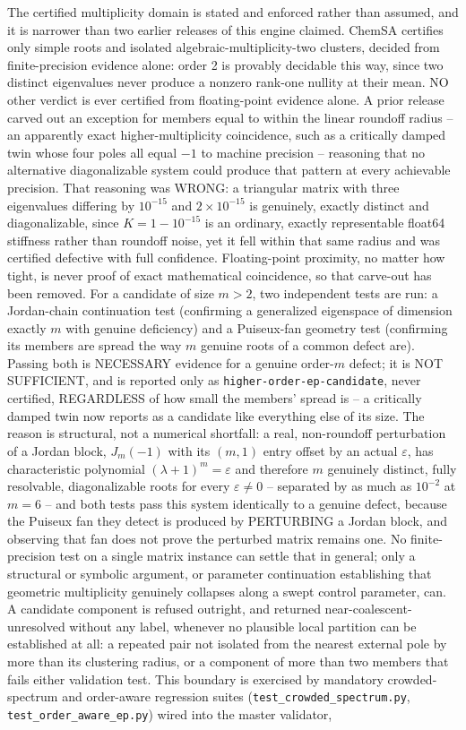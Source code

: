 The certified multiplicity domain is stated and enforced rather than assumed, and it is narrower than two earlier releases of this engine claimed. ChemSA certifies only simple roots and isolated algebraic-multiplicity-two clusters, decided from finite-precision evidence alone: order 2 is provably decidable this way, since two distinct eigenvalues never produce a nonzero rank-one nullity at their mean. NO other verdict is ever certified from floating-point evidence alone. A prior release carved out an exception for members equal to within the linear roundoff radius -- an apparently exact higher-multiplicity coincidence, such as a critically damped twin whose four poles all equal \(-1\) to machine precision -- reasoning that no alternative diagonalizable system could produce that pattern at every achievable precision. That reasoning was WRONG: a triangular matrix with three eigenvalues differing by \(10^{-15}\) and \(2\times10^{-15}\) is genuinely, exactly distinct and diagonalizable, since \(K=1-10^{-15}\) is an ordinary, exactly representable float64 stiffness rather than roundoff noise, yet it fell within that same radius and was certified defective with full confidence. Floating-point proximity, no matter how tight, is never proof of exact mathematical coincidence, so that carve-out has been removed. For a candidate of size \(m>2\), two independent tests are run: a Jordan-chain continuation test (confirming a generalized eigenspace of dimension exactly \(m\) with genuine deficiency) and a Puiseux-fan geometry test (confirming its members are spread the way \(m\) genuine roots of a common defect are). Passing both is NECESSARY evidence for a genuine order-\(m\) defect; it is NOT SUFFICIENT, and is reported only as \texttt{higher-order-ep-candidate}, never certified, REGARDLESS of how small the members' spread is -- a critically damped twin now reports as a candidate like everything else of its size. The reason is structural, not a numerical shortfall: a real, non-roundoff perturbation of a Jordan block, \(J_m(-1)\) with its \((m,1)\) entry offset by an actual \(\varepsilon\), has characteristic polynomial \((\lambda+1)^m=\varepsilon\) and therefore \(m\) genuinely distinct, fully resolvable, diagonalizable roots for every \(\varepsilon\neq0\) -- separated by as much as \(10^{-2}\) at \(m=6\) -- and both tests pass this system identically to a genuine defect, because the Puiseux fan they detect is produced by PERTURBING a Jordan block, and observing that fan does not prove the perturbed matrix remains one. No finite-precision test on a single matrix instance can settle that in general; only a structural or symbolic argument, or parameter continuation establishing that geometric multiplicity genuinely collapses along a swept control parameter, can. A candidate component is refused outright, and returned near-coalescent-unresolved without any label, whenever no plausible local partition can be established at all: a repeated pair not isolated from the nearest external pole by more than its clustering radius, or a component of more than two members that fails either validation test. This boundary is exercised by mandatory crowded-spectrum and order-aware regression suites (\texttt{test\_crowded\_spectrum.py}, \texttt{test\_order\_aware\_ep.py}) wired into the master validator, 